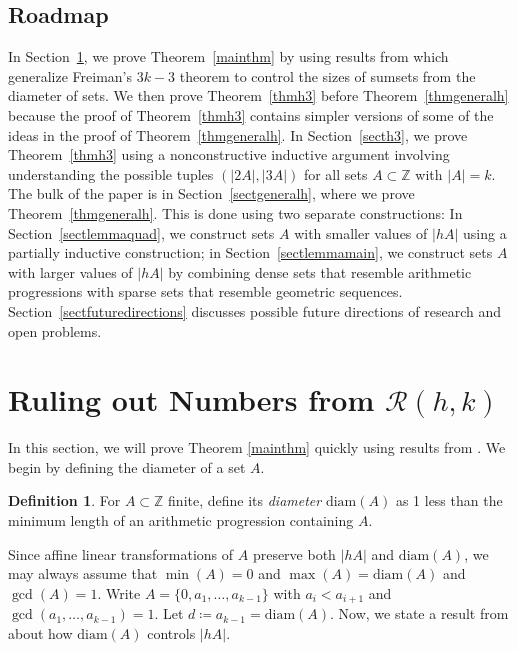 \documentclass{daj}
\theoremstyle{definition}
\newtheorem{definition}[theorem]{Definition}
\theoremstyle{remark}
\numberwithin{equation}{section}
\numberwithin{theorem}{section}
\newcommand{\Z}{\mathbb{Z}}
\newcommand{\calr}{\mathcal{R}}
\newcommand{\diam}{\mathrm{diam}}
\begin{document}
\subsection{Roadmap}
In Section~\ref{sectexcluding}, we prove Theorem~\ref{mainthm} by using results from \cite{Lev96} which generalize Freiman's $3k-3$ theorem to control the sizes of sumsets from the diameter of sets. We then prove Theorem~\ref{thmh3} before Theorem~\ref{thmgeneralh} because the proof of Theorem~\ref{thmh3} contains simpler versions of some of the ideas in the proof of Theorem~\ref{thmgeneralh}. In Section~\ref{secth3}, we prove Theorem~\ref{thmh3} using a nonconstructive inductive argument involving understanding the possible tuples $(|2A|,|3A|)$ for all sets $A \subset \Z$ with $|A| = k$. The bulk of the paper is in Section~\ref{sectgeneralh}, where we prove Theorem~\ref{thmgeneralh}. This is done using two separate constructions: In Section~\ref{sectlemmaquad}, we construct sets $A$ with smaller values of $|hA|$ using a partially inductive construction; in Section~\ref{sectlemmamain}, we construct sets $A$ with larger values of $|hA|$ by combining dense sets that resemble arithmetic progressions with sparse sets that resemble geometric sequences. Section~\ref{sectfuturedirections} discusses possible future directions of research and open problems.



\section{Ruling out Numbers from \texorpdfstring{$\calr(h,k)$}{R(h,k)}}\label{sectexcluding}
In this section, we will prove Theorem \ref{mainthm} quickly using results from \cite{Lev96}. We begin by defining the diameter of a set $A$. 
\begin{definition}
    For $A \subset \Z$ finite, define its \emph{diameter} $\diam(A)$ as 1 less than the minimum length of an arithmetic progression containing $A$.
\end{definition}
Since affine linear transformations of $A$ preserve both $|hA|$ and $\diam(A)$, we may always assume that $\min(A) = 0$ and $\max(A) = \diam(A)$ and $\gcd(A) = 1$. Write $A = \{0,a_1,\ldots,a_{k-1}\}$ with $a_i < a_{i+1}$ and $\gcd(a_1,\ldots,a_{k-1})=1$. Let $d \coloneq a_{k-1} = \diam(A)$. Now, we state a result from \cite{Lev96} about how $\diam(A)$ controls $|hA|$.
\end{document}
